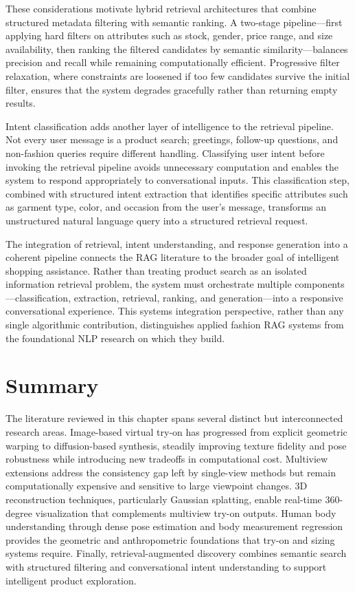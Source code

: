 These considerations motivate hybrid retrieval architectures that combine structured metadata filtering with semantic ranking. A two-stage pipeline—first applying hard filters on attributes such as stock, gender, price range, and size availability, then ranking the filtered candidates by semantic similarity—balances precision and recall while remaining computationally efficient. Progressive filter relaxation, where constraints are loosened if too few candidates survive the initial filter, ensures that the system degrades gracefully rather than returning empty results.

Intent classification adds another layer of intelligence to the retrieval pipeline. Not every user message is a product search; greetings, follow-up questions, and non-fashion queries require different handling. Classifying user intent before invoking the retrieval pipeline avoids unnecessary computation and enables the system to respond appropriately to conversational inputs. This classification step, combined with structured intent extraction that identifies specific attributes such as garment type, color, and occasion from the user's message, transforms an unstructured natural language query into a structured retrieval request.

The integration of retrieval, intent understanding, and response generation into a coherent pipeline connects the RAG literature to the broader goal of intelligent shopping assistance. Rather than treating product search as an isolated information retrieval problem, the system must orchestrate multiple components—classification, extraction, retrieval, ranking, and generation—into a responsive conversational experience. This systems integration perspective, rather than any single algorithmic contribution, distinguishes applied fashion RAG systems from the foundational NLP research on which they build.

\section{Summary}
The literature reviewed in this chapter spans several distinct but interconnected research areas. Image-based virtual try-on has progressed from explicit geometric warping to diffusion-based synthesis, steadily improving texture fidelity and pose robustness while introducing new tradeoffs in computational cost. Multiview extensions address the consistency gap left by single-view methods but remain computationally expensive and sensitive to large viewpoint changes. 3D reconstruction techniques, particularly Gaussian splatting, enable real-time 360-degree visualization that complements multiview try-on outputs. Human body understanding through dense pose estimation and body measurement regression provides the geometric and anthropometric foundations that try-on and sizing systems require. Finally, retrieval-augmented discovery combines semantic search with structured filtering and conversational intent understanding to support intelligent product exploration.

